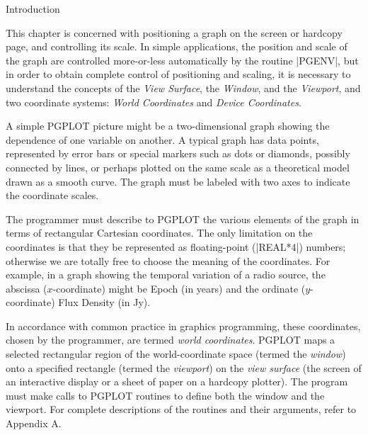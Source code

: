 

\beginsection  Introduction

This chapter is concerned with positioning a graph on the screen or
hardcopy page, and controlling its scale.  In simple applications, the
position and scale of the graph are controlled more-or-less
automatically by the routine |PGENV|, but in order to obtain complete
control of positioning and scaling, it is necessary to understand the
concepts of the {\it View Surface}, the {\it Window}, and the {\it
Viewport}, and two coordinate systems: {\it World Coordinates\/} and {\it
Device Coordinates}. 

A simple PGPLOT picture might be a two-dimensional graph showing the
dependence of one variable on another. A typical graph has data points,
represented by error bars or special markers such as dots or diamonds,
possibly connected by lines, or perhaps plotted on the same scale as a
theoretical model drawn as a smooth curve. The graph must be labeled
with two axes to indicate the coordinate scales. 

The programmer must describe to PGPLOT the various elements of
the graph in terms of rectangular Cartesian coordinates.  The only
limitation on the coordinates is that they be represented as
floating-point (|REAL*4|) numbers; otherwise we are totally free to
choose the meaning of the coordinates. For example, in a graph showing
the temporal variation of a radio source, the abscissa ($x$-coordinate)
might be Epoch (in years) and the ordinate ($y$-coordinate) Flux Density
(in Jy). 

In accordance with common practice in graphics programming, these
coordinates, chosen by the programmer, are termed {\it world
coordinates\/}. PGPLOT maps a selected rectangular region of the
world-coordinate space (termed the {\it window\/}) onto a specified
rectangle (termed the {\it viewport\/}) on the {\it view surface\/} (the
screen of an interactive display or a sheet of paper on a hardcopy
plotter).  The program must make calls to PGPLOT routines to define both
the window and the viewport. For complete descriptions of the routines 
and their arguments, refer to Appendix A.

